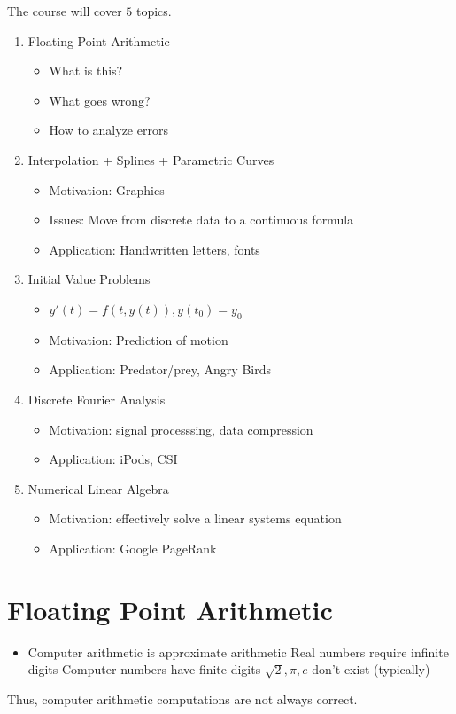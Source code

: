 \documentclass{article}
\begin{document}
The course will cover $5$ topics.

\begin{enumerate}
	\item Floating Point Arithmetic
		\begin{itemize}
			\item What is this?
			\item What goes wrong?
			\item How to analyze errors
		\end{itemize}
	\item Interpolation + Splines + Parametric Curves
		\begin{itemize}
			\item Motivation: Graphics
			\item Issues: Move from discrete data to a continuous formula
			\item Application: Handwritten letters, fonts
		\end{itemize}
	\item Initial Value Problems
		\begin{itemize}
			\item $y'(t) = f(t,y(t)), y(t_0) = y_0$
			\item Motivation: Prediction of motion
			\item Application: Predator/prey, Angry Birds
		\end{itemize}
	\item Discrete Fourier Analysis
		\begin{itemize}
			\item Motivation: signal processsing, data compression
			\item Application: iPods, CSI
		\end{itemize}
	\item Numerical Linear Algebra
		\begin{itemize}
			\item Motivation: effectively solve a linear systems equation
			\item Application: Google PageRank
		\end{itemize}
\end{enumerate}

\section{Floating Point Arithmetic}

\begin{itemize}
	\item Computer arithmetic is approximate arithmetic
		\subitem Real numbers require infinite digits
		\subitem Computer numbers have finite digits
		\subitem $\sqrt{2}, \pi, e$ don't exist (typically)
\end{itemize}
Thus, computer arithmetic computations are not always correct.
\end{document}
